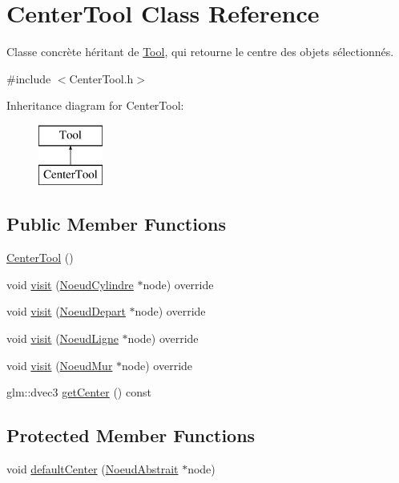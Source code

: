 \hypertarget{class_center_tool}{}\section{Center\+Tool Class Reference}
\label{class_center_tool}


Classe concrète héritant de \hyperlink{class_tool}{Tool}, qui retourne le centre des objets sélectionnés.  




{\ttfamily \#include $<$Center\+Tool.\+h$>$}

Inheritance diagram for Center\+Tool\+:\begin{figure}[H]
\begin{center}
\leavevmode
\includegraphics[height=2.000000cm]{class_center_tool}
\end{center}
\end{figure}
\subsection*{Public Member Functions}
\begin{DoxyCompactItemize}
\item 
\hyperlink{group__inf2990_ga3814d534b50e7dff7fbd7efef552685d}{Center\+Tool} ()
\item 
void \hyperlink{group__inf2990_ga9ceff880a444e12bc6b4dab4313c1809}{visit} (\hyperlink{class_noeud_cylindre}{Noeud\+Cylindre} $\ast$node) override
\item 
void \hyperlink{group__inf2990_ga8417547d629ccacfa218979e6ba6cdf5}{visit} (\hyperlink{class_noeud_depart}{Noeud\+Depart} $\ast$node) override
\item 
void \hyperlink{group__inf2990_ga2edfc60eff7382474a31c34d627ea348}{visit} (\hyperlink{class_noeud_ligne}{Noeud\+Ligne} $\ast$node) override
\item 
void \hyperlink{group__inf2990_ga13d2bac067f4262be4fd60c302a07124}{visit} (\hyperlink{class_noeud_mur}{Noeud\+Mur} $\ast$node) override
\item 
glm\+::dvec3 \hyperlink{group__inf2990_gaf086e5f530c5189f4b72563a4abfe35f}{get\+Center} () const 
\end{DoxyCompactItemize}
\subsection*{Protected Member Functions}
\begin{DoxyCompactItemize}
\item 
void \hyperlink{group__inf2990_gab64cc9d2d491c0bd04a1efc4756740df}{default\+Center} (\hyperlink{class_noeud_abstrait}{Noeud\+Abstrait} $\ast$node)
\end{DoxyCompactItemize}


